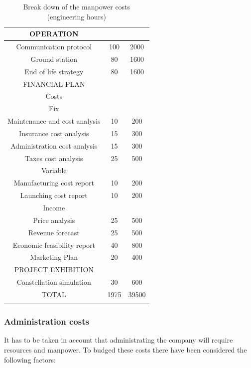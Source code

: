 \begin{longtable}{ccc}
	\rowcolor[gray]{0.85}
	OPERATION &  &  \\ \hline
	Communication protocol & 100 & 2000 \\ \hline
	Ground station & 80 & 1600 \\ \hline
	End of life strategy & 80 & 1600 \\ \hline
	\rowcolor[gray]{0.85}
	FINANCIAL PLAN &  &  \\ \hline
	Costs &  &  \\ \hline
	Fix &  &  \\ \hline
	Maintenance and cost analysis & 10 & 200 \\ \hline
	Insurance cost analysis & 15 & 300 \\ \hline
	Administration cost analysis & 15 & 300 \\ \hline
	Taxes cost analysis & 25 & 500 \\ \hline
	Variable &  &  \\ \hline
	Manufacturing cost report & 10 & 200 \\ \hline
	Launching cost report & 10 & 200 \\ \hline
	Income &  &  \\ \hline
	Price analysis & 25 & 500 \\ \hline
	Revenue forecast & 25 & 500 \\ \hline
	Economic feasibility report & 40 & 800 \\ \hline
	Marketing Plan & 20 & 400 \\ \hline
	\rowcolor[gray]{0.85}
	PROJECT EXHIBITION &  &  \\ \hline
	Constellation simulation & 30 & 600 \\ \hline
	\rowcolor[gray]{0.65}
	TOTAL & 1975 & 39500 \\
	\bottomrule
\caption[Engineering Hours]{Break down of the manpower costs (engineering hours)}
\end{longtable}

\subsubsection{Administration costs}
It has to be taken in account that administrating the company will require resources and manpower. To budged these costs there have been considered the following factors:

